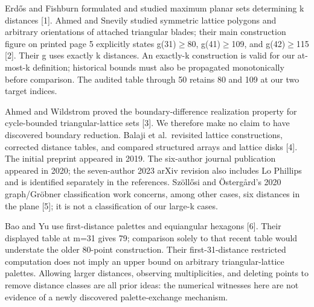 \documentclass[
]{article}
\begin{document}
Erdős and Fishburn formulated and studied maximum planar sets
determining k distances {[}1{]}. Ahmed and Snevily studied symmetric
lattice polygons and arbitrary orientations of attached triangular
blades; their main construction figure on printed page 5 explicitly
states g(31)\ensuremath{\ge}80, g(41)\ensuremath{\ge}109, and g(42)\ensuremath{\ge}115 {[}2{]}. Their g uses exactly
k distances. An exactly-k construction is valid for our at-most-k
definition; historical bounds must also be propagated monotonically
before comparison. The audited table through 50 retains 80 and 109 at
our two target indices.

Ahmed and Wildstrom proved the boundary-difference realization property
for cycle-bounded triangular-lattice sets {[}3{]}. We therefore make no
claim to have discovered boundary reduction. Balaji et al.~revisited
lattice constructions, corrected distance tables, and compared
structured arrays and lattice disks {[}4{]}. The initial preprint
appeared in 2019. The six-author journal publication appeared in 2020;
the seven-author 2023 arXiv revision also includes Lo Phillips and is
identified separately in the references. Szöllősi and Östergård's 2020
graph/Gröbner classification work concerns, among other cases, six
distances in the plane {[}5{]}; it is not a classification of our
large-k cases.

Bao and Yu use first-distance palettes and equiangular hexagons {[}6{]}.
Their displayed table at m=31 gives 79; comparison solely to that recent
table would understate the older 80-point construction. Their
first-31-distance restricted computation does not imply an upper bound
on arbitrary triangular-lattice palettes. Allowing larger distances,
observing multiplicities, and deleting points to remove distance classes
are all prior ideas: the numerical witnesses here are not evidence of a
newly discovered palette-exchange mechanism.
\end{document}

